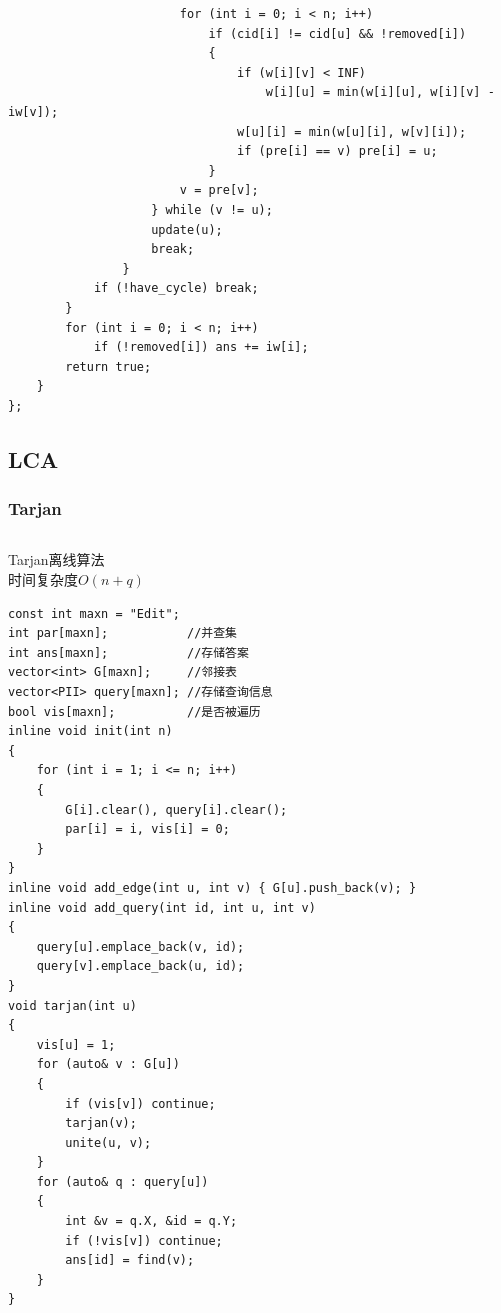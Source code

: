 \documentclass[twoside]{article}
\begin{document}
\begin{lstlisting}
                        for (int i = 0; i < n; i++)
                            if (cid[i] != cid[u] && !removed[i])
                            {
                                if (w[i][v] < INF)
                                    w[i][u] = min(w[i][u], w[i][v] - iw[v]);
                                w[u][i] = min(w[u][i], w[v][i]);
                                if (pre[i] == v) pre[i] = u;
                            }
                        v = pre[v];
                    } while (v != u);
                    update(u);
                    break;
                }
            if (!have_cycle) break;
        }
        for (int i = 0; i < n; i++)
            if (!removed[i]) ans += iw[i];
        return true;
    }
};\end{lstlisting}
\subsection{LCA}
\subsubsection{Tarjan}
\begin{lstlisting}
\end{lstlisting}
Tarjan离线算法\\
时间复杂度$O(n+q)$
\begin{lstlisting}
const int maxn = "Edit";
int par[maxn];           //并查集
int ans[maxn];           //存储答案
vector<int> G[maxn];     //邻接表
vector<PII> query[maxn]; //存储查询信息
bool vis[maxn];          //是否被遍历
inline void init(int n)
{
    for (int i = 1; i <= n; i++)
    {
        G[i].clear(), query[i].clear();
        par[i] = i, vis[i] = 0;
    }
}
inline void add_edge(int u, int v) { G[u].push_back(v); }
inline void add_query(int id, int u, int v)
{
    query[u].emplace_back(v, id);
    query[v].emplace_back(u, id);
}
void tarjan(int u)
{
    vis[u] = 1;
    for (auto& v : G[u])
    {
        if (vis[v]) continue;
        tarjan(v);
        unite(u, v);
    }
    for (auto& q : query[u])
    {
        int &v = q.X, &id = q.Y;
        if (!vis[v]) continue;
        ans[id] = find(v);
    }
}
\end{lstlisting}
\end{document}
